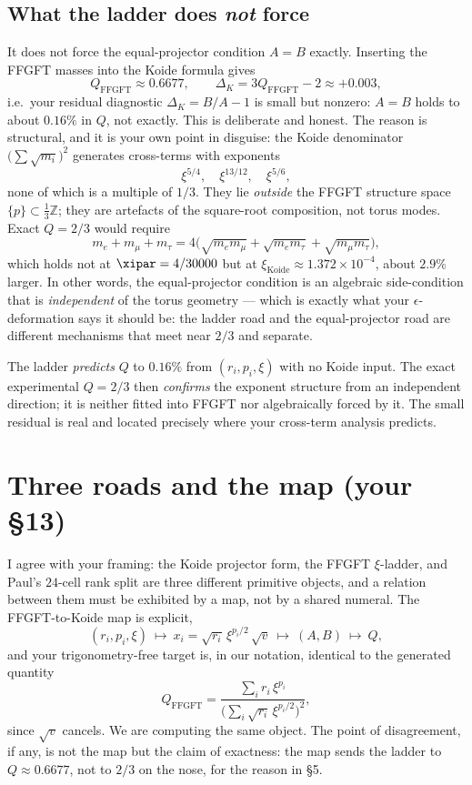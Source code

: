 \subsection*{What the ladder does \emph{not} force}

It does not force the equal-projector condition $A=B$ exactly. Inserting the
FFGFT masses into the Koide formula gives
\[
  Q_{\text{FFGFT}} \approx 0.6677,
  \qquad
  \Delta_K = 3Q_{\text{FFGFT}} - 2 \approx +0.003,
\]
i.e.\ your residual diagnostic $\Delta_K = B/A - 1$ is small but nonzero:
$A = B$ holds to about $0.16\%$ in $Q$, not exactly. This is deliberate and
honest. The reason is structural, and it is your own point in disguise: the
Koide denominator $\big(\sum \sqrt{m_i}\big)^2$ generates cross-terms with
exponents
\[
  \xi^{5/4}, \quad \xi^{13/12}, \quad \xi^{5/6},
\]
none of which is a multiple of $1/3$. They lie \emph{outside} the FFGFT
structure space $\{p\} \subset \tfrac{1}{3}\mathbb{Z}$; they are artefacts of
the square-root composition, not torus modes. Exact $Q = 2/3$ would require
\[
  m_e + m_\mu + m_\tau = 4\big(\sqrt{m_e m_\mu} + \sqrt{m_e m_\tau} + \sqrt{m_\mu m_\tau}\big),
\]
which holds not at $\xipar = 4/30000$ but at $\xi_{\text{Koide}} \approx
1.372\times 10^{-4}$, about $2.9\%$ larger. In other words, the
equal-projector condition is an algebraic side-condition that is
\emph{independent} of the torus geometry --- which is exactly what your
$\epsilon$-deformation says it should be: the ladder road and the
equal-projector road are different mechanisms that meet near $2/3$ and
separate.

\begin{keypoint}
The ladder \emph{predicts} $Q$ to $0.16\%$ from $(r_i, p_i, \xi)$ with no
Koide input. The exact experimental $Q = 2/3$ then \emph{confirms} the
exponent structure from an independent direction; it is neither fitted into
FFGFT nor algebraically forced by it. The small residual is real and
located precisely where your cross-term analysis predicts.
\end{keypoint}

\section{Three roads and the map (your \S13)}

I agree with your framing: the Koide projector form, the FFGFT $\xi$-ladder,
and Paul's $24$-cell rank split are three different primitive objects, and a
relation between them must be exhibited by a map, not by a shared numeral.
The FFGFT-to-Koide map is explicit,
\[
  (r_i, p_i, \xi)\ \longmapsto\ x_i = \sqrt{r_i}\,\xi^{p_i/2}\,\sqrt{v}
  \ \longmapsto\ (A, B)\ \longmapsto\ Q,
\]
and your trigonometry-free target is, in our notation, identical to the
generated quantity
\[
  Q_{\text{FFGFT}} =
  \frac{\sum_i r_i\,\xi^{p_i}}{\big(\sum_i \sqrt{r_i}\,\xi^{p_i/2}\big)^2},
\]
since $\sqrt{v}$ cancels. We are computing the same object. The point of
disagreement, if any, is not the map but the claim of exactness: the map
sends the ladder to $Q \approx 0.6677$, not to $2/3$ on the nose, for the
reason in \S5.

